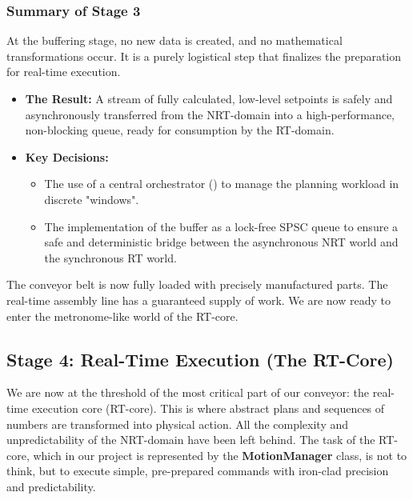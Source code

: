 \subsubsection{Summary of Stage 3}
\label{subsubsec:stage3_summary_expanded}
At the buffering stage, no new data is created, and no mathematical transformations occur. It is a purely logistical step that finalizes the preparation for real-time execution.
\begin{itemize}
    \item \textbf{The Result:} A stream of fully calculated, low-level setpoints is safely and asynchronously transferred from the NRT-domain into a high-performance, non-blocking queue, ready for consumption by the RT-domain.
    \item \textbf{Key Decisions:}
    \begin{itemize}
        \item The use of a central orchestrator () to manage the planning workload in discrete "windows".
        \item The implementation of the buffer as a lock-free SPSC queue to ensure a safe and deterministic bridge between the asynchronous NRT world and the synchronous RT world.
    \end{itemize}
\end{itemize}

The conveyor belt is now fully loaded with precisely manufactured parts. The real-time assembly line has a guaranteed supply of work. We are now ready to enter the metronome-like world of the RT-core.



\subsection{Stage 4: Real-Time Execution (The RT-Core)}
\label{subsec:stage4_rt_core}

We are now at the threshold of the most critical part of our conveyor: the real-time execution core (RT-core). This is where abstract plans and sequences of numbers are transformed into physical action. All the complexity and unpredictability of the NRT-domain have been left behind. The task of the RT-core, which in our project is represented by the \textbf{MotionManager} class, is not to think, but to execute simple, pre-prepared commands with iron-clad precision and predictability.

